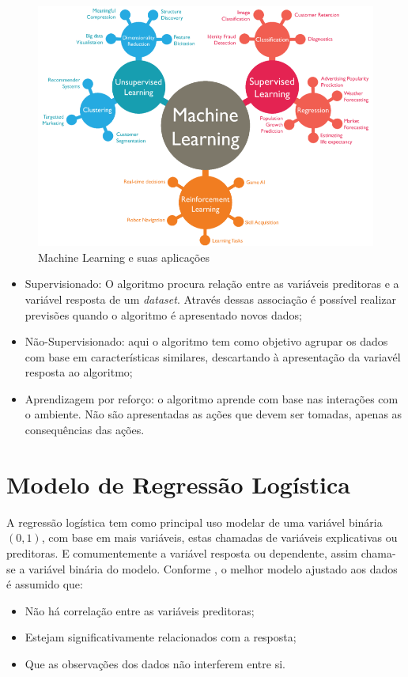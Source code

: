 \documentclass[
	12pt,				%
	openright,			%
	oneside,      %
	a4paper,			%
	english,			%
	french,				%
	spanish,			%
	brazil,				%
	]{abntex2}\usepackage[]{graphicx}\usepackage[table]{xcolor}
\theoremstyle{definition}
\begin{document}
    \begin{figure}
      \caption{\label{img1}Machine Learning e suas aplicações}
      \begin{center}
        \includegraphics[scale = 0.4]{image/img1.png}
      \end{center}
    \end{figure}
  
\begin{itemize}
  \item Supervisionado: O algoritmo procura relação entre as variáveis preditoras e 
  a variável resposta de um \textit{dataset}. Através dessas associação é possível 
  realizar previsões quando o algoritmo é apresentado novos dados;
  \item Não-Supervisionado: aqui o algoritmo tem como objetivo agrupar os dados com 
  base em características similares, descartando à apresentação da variavél resposta ao 
  algoritmo;
  \item Aprendizagem por reforço: o algoritmo aprende com base nas interações com o 
  ambiente. Não são apresentadas as ações que devem ser tomadas, apenas as consequências das ações.
\end{itemize}


  \section{Modelo de Regressão Logística}

  
A regressão logística tem como principal uso modelar de uma variável binária $(0,1)$,
com base em mais variáveis, estas chamadas de variáveis explicativas ou preditoras.
E comumentemente a variável resposta ou dependente, assim chama-se a variável
binária do modelo. Conforme \cite{hilbe2016practical}, o melhor modelo ajustado 
aos dados é assumido que:
\begin{itemize}
  \item Não há correlação entre as variáveis preditoras;
  \item Estejam significativamente relacionados com a resposta;
  \item Que as observações dos dados não interferem entre si.
\end{itemize}
  
\end{document}
